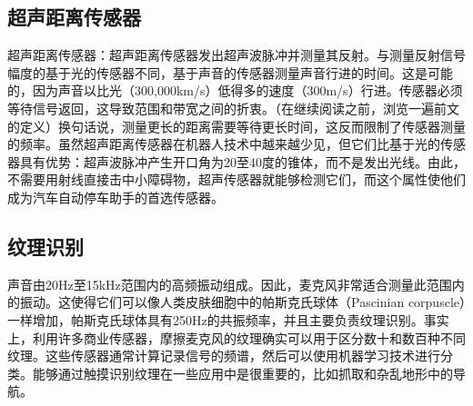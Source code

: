 \subsection{超声距离传感器}
超声距离传感器：超声距离传感器发出超声波脉冲并测量其反射。与测量反射信号幅度的基于光的传感器不同，基于声音的传感器测量声音行进的时间。这是可能的，因为声音以比光（300,000km/s）低得多的速度（300m/s）行进。传感器必须等待信号返回，这导致范围和带宽之间的折衷。（在继续阅读之前，浏览一遍前文的定义）换句话说，测量更长的距离需要等待更长时间，这反而限制了传感器测量的频率。虽然超声距离传感器在机器人技术中越来越少见，但它们比基于光的传感器具有优势：超声波脉冲产生开口角为20至40度的锥体，而不是发出光线。由此，不需要用射线直接击中小障碍物，超声传感器就能够检测它们，而这个属性使他们成为汽车自动停车助手的首选传感器。



\subsection{纹理识别}
声音由20Hz至15kHz范围内的高频振动组成。因此，麦克风非常适合测量此范围内的振动。这使得它们可以像人类皮肤细胞中的帕斯克氏球体（Pascinian corpuscle）一样增加，帕斯克氏球体具有250Hz的共振频率，并且主要负责纹理识别。事实上，利用许多商业传感器，摩擦麦克风的纹理确实可以用于区分数十和数百种不同纹理\cite{hughes14}。这些传感器通常计算记录信号的频谱，然后可以使用机器学习技术进行分类。能够通过触摸识别纹理在一些应用中是很重要的，比如抓取和杂乱地形中的导航。



